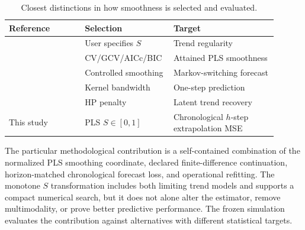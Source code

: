 \begin{table}[t]
\centering
\small
\caption{Closest distinctions in how smoothness
is selected and evaluated.}
\label{tab:literature_positioning}
\begin{tabular}{@{}p{0.27\linewidth}p{0.26\linewidth}p{0.37\linewidth}@{}}
\toprule
Reference & Selection & Target\\
\midrule
\citet{guerrero2008smoothness} & User specifies $S$ & Trend regularity\\
\citet{cortes2017smoothness} & CV/GCV/AICc/BIC & Attained PLS smoothness\\
\citet{islas2019remittances} & Controlled smoothing & Markov-switching forecast\\
\citet{hart1994tscv} & Kernel bandwidth & One-step prediction\\
\citet{franke2026hp} & HP penalty & Latent trend recovery\\
This study & PLS $S\in[0,1]$ & Chronological $h$-step extrapolation MSE\\
\bottomrule
\end{tabular}
\end{table}

The particular methodological contribution
is a self-contained combination of the
normalized PLS smoothing coordinate,
declared finite-difference continuation,
horizon-matched chronological forecast
loss, and operational refitting.
The monotone $S$ transformation includes
both limiting trend models and supports
a compact numerical search, but it
does not alone alter the estimator,
remove multimodality, or prove better
predictive performance. The frozen
simulation evaluates the contribution
against alternatives with different
statistical targets.
